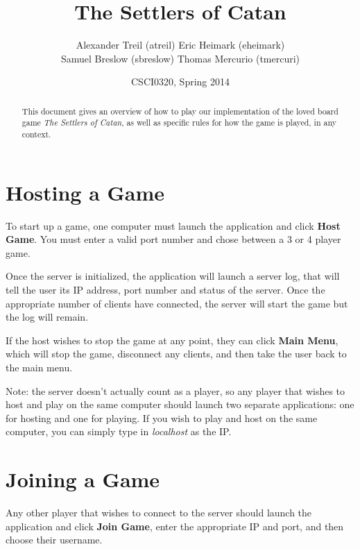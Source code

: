 \documentclass[12pt,letterpaper,titlepage]{article}
\begin{document}
\title{\textbf{The Settlers of Catan}}
\author{Alexander Treil (atreil) Eric Heimark (eheimark)\\Samuel Breslow (sbreslow) Thomas Mercurio (tmercuri)}
\date{CSCI0320, Spring 2014}
\maketitle

\begin{abstract}
This document gives an overview of how to play our implementation of the loved board game \emph{The Settlers of Catan}, as well as specific rules for how the game is played, in any context.
\end{abstract}

\tableofcontents

\newpage
{}

\section{Hosting a Game}
To start up a game, one computer must launch the application and click \textbf{Host Game}. You must enter a valid port number and chose between a 3 or 4 player game.

Once the server is initialized, the application will launch a server log, that will tell the user its IP address, port number and status of the server. Once the appropriate number of clients have connected, the server will start the game but the log will remain.

If the host wishes to stop the game at any point, they can click \textbf{Main Menu}, which will stop the game, disconnect any clients, and then take the user back to the main menu.

Note: the server doesn't actually count as a player, so any player that wishes to host and play on the same computer should launch two separate applications: one for hosting and one for playing. If you wish to play and host on the same computer, you can simply type in \emph{localhost} as the IP.

\section{Joining a Game}
Any other player that wishes to connect to the server should launch the application and click \textbf{Join Game}, enter the appropriate IP and port, and then choose their username.
\end{document}
